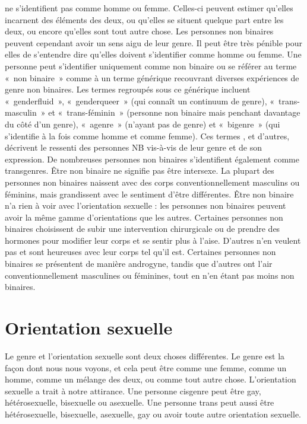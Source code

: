 \documentclass[12pt,openany]{book}
\begin{document}
\newpage
\noindent ne s’identifient pas comme homme ou femme. Celles-ci peuvent estimer qu’elles incarnent des éléments des deux, ou qu’elles se situent quelque part entre les deux, ou encore qu’elles sont tout autre chose. Les personnes non binaires peuvent cependant avoir un sens aigu de leur genre. Il peut être très pénible pour elles de s’entendre dire qu’elles doivent s’identifier comme homme ou femme. Une personne peut s’identifier uniquement comme non binaire ou se référer au terme \mbox{« n}on binair\mbox{e »} comme à un terme générique recouvrant diverses expériences de genre non binaires. Les termes regroupés sous ce générique incluent \mbox{« genderfluid »}, \mbox{« genderqueer »} (qui connaît un continuum de genre), \mbox{« t}rans-masculi\mbox{n »} et \mbox{« t}rans-fémini\mbox{n »} (personne non binaire mais penchant davantage du côté d’un genre), \mbox{« agenre »} (n’ayant pas de genre) et \mbox{« bigenre »} (qui s’identifie à la fois comme homme et comme femme). Ces termes , et d’autres, décrivent le ressenti des personnes NB vis-à-vis de leur genre et de son expression. De nombreuses personnes non binaires s’identifient également comme transgenres. Être non binaire ne signifie pas être intersexe. La plupart des personnes non binaires naissent avec des corps conventionnellement masculins ou féminins, mais grandissent avec le sentiment d’être différentes. Être non binaire n’a rien à voir avec l’orientation sexuelle : les personnes non binaires peuvent avoir la même gamme d’orientations que les autres. Certaines personnes non binaires choisissent de subir une intervention chirurgicale ou de prendre des hormones pour modifier leur corps et se sentir plus à l’aise. D’autres n’en veulent pas et sont heureuses avec leur corps tel qu’il est. Certaines personnes non binaires se présentent de manière androgyne, tandis que d’autres ont l’air conventionnellement masculines ou féminines, tout en n’en étant pas moins non binaires.

\section*{Orientation sexuelle}

\noindent Le genre et l’orientation sexuelle sont deux choses différentes. Le genre est la façon dont nous nous voyons, et cela peut être comme une femme, comme un homme, comme un mélange des deux, ou comme tout autre chose. L’orientation sexuelle a trait à notre attirance. Une personne cisgenre peut être gay, hétérosexuelle, bisexuelle ou asexuelle. Une personne trans peut aussi être hétérosexuelle, bisexuelle, asexuelle, gay ou avoir toute autre orientation sexuelle.
\end{document}
